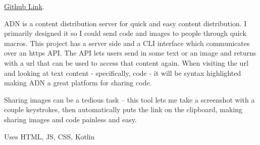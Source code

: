 \documentclass[10pt,letterpaper]{article}
\def\link#1#2{\color{blue!60!black}\href{#1}{#2}\color{black}}
\begin{document}
    \link{https://github.com/mee42/adn}{Github Link}.
    
    ADN is a content distribution server for quick and easy content distribution.
    I primarily designed it so I could send code and images to people through quick macros.
    This project has a server side and a CLI interface which communicates over an https API.
    The API lets users send in some text or an image
    and returns with a url that can be used to access that content again.
    When visiting the url and looking at text content - specifically, code - it will be syntax highlighted
    making ADN a great platform for sharing code.

    Sharing images can be a tedious task -- 
    this tool lets me take a screenshot with a couple keystrokes,
    then automatically puts the link on the clipboard,
    making sharing images and code painless and easy.

    \vspace{0.5em}
    \noindent Uses HTML, JS, CSS, Kotlin
\end{document}

